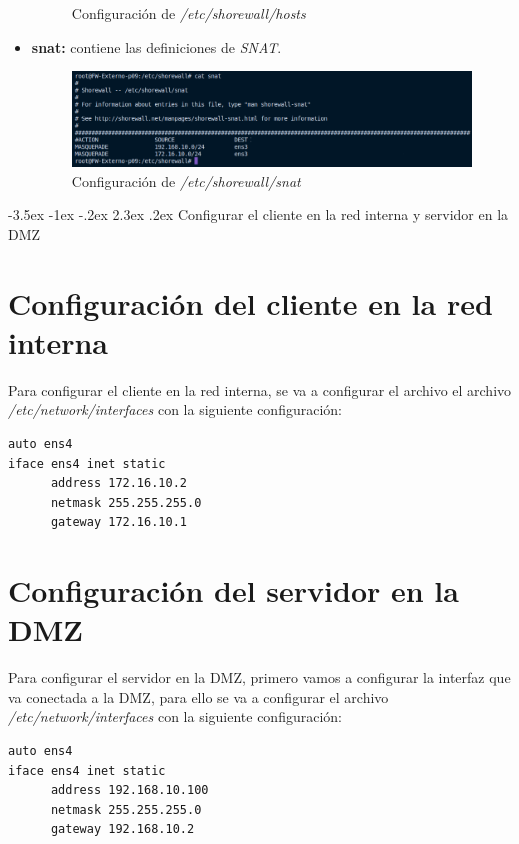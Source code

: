 \documentclass[11pt]{report}
\makeatletter
\renewcommand\chapter{\@startsection{chapter}{0}{\z@}%
    {-3.5ex \@plus -1ex \@minus -.2ex}%
    {2.3ex \@plus.2ex}%
    {\normalfont\Large\bfseries}}
\makeatother
\begin{document}
\begin{itemize}
\begin{figure}[H]
    \caption{Configuración de \emph{/etc/shorewall/hosts}}
    \label{fig:Configuracion de /etc/shorewall/hosts}
  \end{figure}
  \item \textbf{snat:} contiene las definiciones de \emph{SNAT}. 
  \begin{figure}[H]
    \centering
    \includegraphics[scale=0.55]{img/snat_config.png}
    \caption{Configuración de \emph{/etc/shorewall/snat}}
    \label{fig:Configuracion de /etc/shorewall/snat}
  \end{figure}
\end{itemize}

\cleardoublepage

\chapter{Configurar el cliente en la red interna y servidor en la DMZ}
\section{Configuración del cliente en la red interna}
Para configurar el cliente en la red interna, se va a configurar el archivo el archivo \emph{/etc/network/interfaces}
con la siguiente configuración:
\begin{verbatim}
auto ens4
iface ens4 inet static
      address 172.16.10.2
      netmask 255.255.255.0
      gateway 172.16.10.1
\end{verbatim}

\section{Configuración del servidor en la DMZ}
Para configurar el servidor en la DMZ, primero vamos a configurar la interfaz que va conectada a la DMZ, para ello se va a configurar el archivo \emph{/etc/network/interfaces}
con la siguiente configuración:
\begin{verbatim}
auto ens4
iface ens4 inet static
      address 192.168.10.100
      netmask 255.255.255.0
      gateway 192.168.10.2
\end{verbatim}
\end{document}
